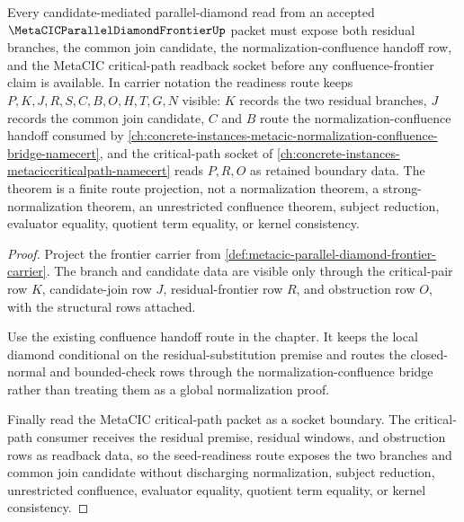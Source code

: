 \begin{theorem}
\label{thm:metacic-parallel-diamond-frontier-seed-readiness}
Every candidate-mediated parallel-diamond read from an accepted $\MetaCICParallelDiamondFrontierUp$ packet must expose both residual branches, the common join candidate, the normalization-confluence handoff row, and the MetaCIC critical-path readback socket before any confluence-frontier claim is available. In carrier notation the readiness route keeps $P,K,J,R,S,C,B,O,H,T,G,N$ visible: $K$ records the two residual branches, $J$ records the common join candidate, $C$ and $B$ route the normalization-confluence handoff consumed by \autoref{ch:concrete-instances-metacic-normalization-confluence-bridge-namecert}, and the critical-path socket of \autoref{ch:concrete-instances-metaciccriticalpath-namecert} reads $P,R,O$ as retained boundary data. The theorem is a finite route projection, not a normalization theorem, a strong-normalization theorem, an unrestricted confluence theorem, subject reduction, evaluator equality, quotient term equality, or kernel consistency.
\end{theorem}
\begin{proof}
Project the frontier carrier from \autoref{def:metacic-parallel-diamond-frontier-carrier}. The branch and candidate data are visible only through the critical-pair row $K$, candidate-join row $J$, residual-frontier row $R$, and obstruction row $O$, with the structural rows attached.

Use the existing confluence handoff route in the chapter. It keeps the local diamond conditional on the residual-substitution premise and routes the closed-normal and bounded-check rows through the normalization-confluence bridge rather than treating them as a global normalization proof.

Finally read the MetaCIC critical-path packet as a socket boundary. The critical-path consumer receives the residual premise, residual windows, and obstruction rows as readback data, so the seed-readiness route exposes the two branches and common join candidate without discharging normalization, subject reduction, unrestricted confluence, evaluator equality, quotient term equality, or kernel consistency.
\end{proof}

